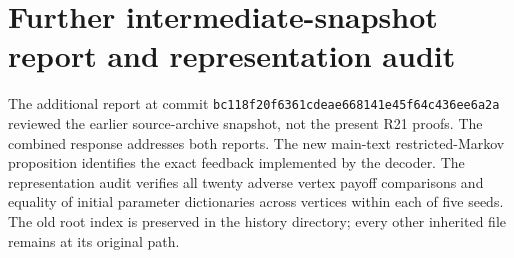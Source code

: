 \section{Further intermediate-snapshot report and representation audit}
The additional report at commit \nolinkurl{bc118f20f6361cdeae668141e45f64c436ee6a2a} reviewed the earlier source-archive snapshot, not the present R21 proofs. The combined response addresses both reports. The new main-text restricted-Markov proposition identifies the exact feedback implemented by the decoder. The representation audit verifies all twenty adverse vertex payoff comparisons and equality of initial parameter dictionaries across vertices within each of five seeds. The old root index is preserved in the history directory; every other inherited file remains at its original path.
